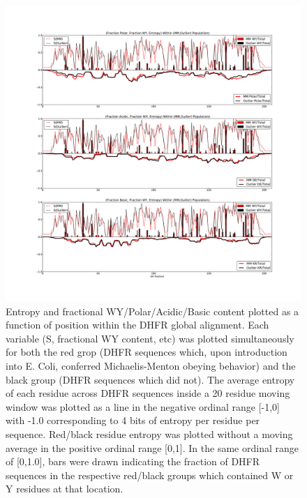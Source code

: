 \documentclass[a4paper,11pt]{article}
\begin{document}
\begin{figure}[h]
\centerline{\includegraphics[width=8in]{AA+S_smooth.pdf}}
\caption[$S_{\rm red}$, $S_{\rm black}$, Moving-Average $S_{\rm red}$, Moving-Average $S_{\rm black}$, WY Content vs Residue \#]{Entropy and fractional WY/Polar/Acidic/Basic content plotted as a function of position within the DHFR global alignment. Each variable (S, fractional WY content, etc) was plotted simultaneously for both the red grop (DHFR sequences which, upon introduction into E. Coli, conferred Michaelis-Menton obeying behavior) and the black group (DHFR sequences which did not). The average entropy of each residue across DHFR sequences inside a 20 residue moving window was plotted as a line in the negative ordinal range [-1,0] with -1.0 corresponding to 4 bits of entropy per residue per sequence. Red/black residue entropy was plotted without a moving average in the positive ordinal range [0,1]. In the same ordinal range of [0,1.0], bars were drawn indicating the fraction of DHFR sequences in the respective red/black groups which contained W or Y residues at that location.}
\end{figure}
\end{document}
